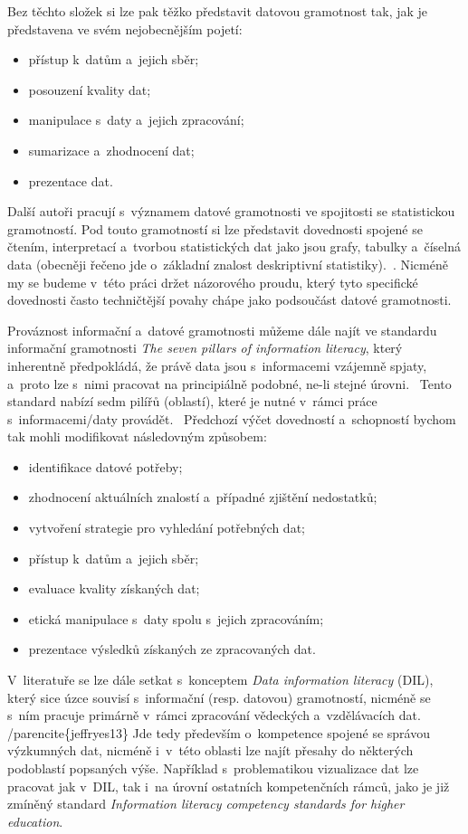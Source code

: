 Bez těchto složek si lze pak těžko představit datovou gramotnost tak, jak je představena ve svém nejobecnějším pojetí:~\parencite[8]{schield05}

\begin{itemize}
\tightlist
\item
  přístup k~datům a~jejich sběr;
\item
  posouzení kvality dat;
\item
  manipulace s~daty a~jejich zpracování;
\item
  sumarizace a~zhodnocení dat;
\item
  prezentace dat.
\end{itemize}

Další autoři pracují s~významem datové gramotnosti ve spojitosti se statistickou gramotností. Pod touto gramotností si lze představit dovednosti spojené se čtením, interpretací a~tvorbou statistických dat jako jsou grafy, tabulky a~číselná data (obecněji řečeno jde o~základní znalost deskriptivní statistiky).~\parencite[8]{schield05}. Nicméně my se budeme v~této práci držet názorového proudu, který tyto specifické dovednosti často techničtější povahy chápe jako podsoučást datové gramotnosti.~\parencite[125]{calzada13}

Prováznost informační a~datové gramotnosti můžeme dále najít ve standardu informační gramotnosti \emph{The seven pillars of information literacy}, který inherentně předpokládá, že právě data jsou s~informacemi vzájemně spjaty, a~proto lze s~nimi pracovat na principiálně podobné, ne-li stejné úrovni.~\parencite[126]{calzada13} Tento standard nabízí sedm pilířů (oblastí), které je nutné v~rámci práce s~informacemi/daty provádět.~\parencite{sconul11} Předchozí výčet dovedností a~schopností bychom tak mohli modifikovat následovným způsobem:

\begin{itemize}
\tightlist
\item
  identifikace datové potřeby;
\item
  zhodnocení aktuálních znalostí a~případné zjištění nedostatků;
\item
  vytvoření strategie pro vyhledání potřebných dat;
\item
  přístup k~datům a~jejich sběr;
\item
  evaluace kvality získaných dat;
\item
  etická manipulace s~daty spolu s~jejich zpracováním;
\item
  prezentace výsledků získaných ze zpracovaných dat.
\end{itemize}

V~literatuře se lze dále setkat s~konceptem \emph{Data information literacy} (DIL), který sice úzce souvisí s~informační (resp. datovou) gramotností, nicméně se s~ním pracuje primárně v~rámci zpracování vědeckých a~vzdělávacích dat. /parencite\{jeffryes13\} Jde tedy především o~kompetence spojené se správou výzkumných dat, nicméně i~v~této oblasti lze najít přesahy do některých podoblastí popsaných výše. Například s~problematikou vizualizace dat lze pracovat jak v~DIL, tak i~na úrovní ostatních kompetenčních rámců, jako je již zmíněný standard \emph{Information literacy competency standards for higher education}.

